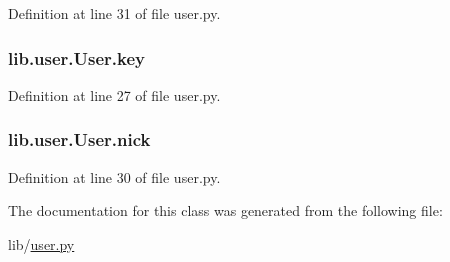 Definition at line 31 of file user.\+py.

\subsubsection[{\texorpdfstring{key}{key}}]{\setlength{\rightskip}{0pt plus 5cm}lib.\+user.\+User.\+key}\hypertarget{classlib_1_1user_1_1_user_a357be6a34d783cd35fc3dc33aa24a528}{}\label{classlib_1_1user_1_1_user_a357be6a34d783cd35fc3dc33aa24a528}


Definition at line 27 of file user.\+py.

\subsubsection[{\texorpdfstring{nick}{nick}}]{\setlength{\rightskip}{0pt plus 5cm}lib.\+user.\+User.\+nick}\hypertarget{classlib_1_1user_1_1_user_a8215952f8dbb5b653b428765e5b55dec}{}\label{classlib_1_1user_1_1_user_a8215952f8dbb5b653b428765e5b55dec}


Definition at line 30 of file user.\+py.



The documentation for this class was generated from the following file\+:\begin{DoxyCompactItemize}
\item 
lib/\hyperlink{user_8py}{user.\+py}\end{DoxyCompactItemize}
